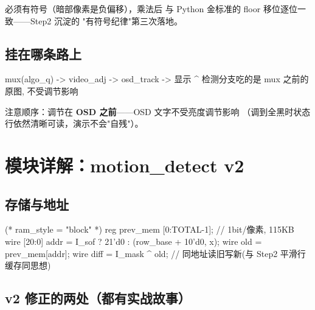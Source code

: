 
 必须有符号（暗部像素是负偏移），乘法后 
与 Python 金标准的 floor 移位逐位一致——Step2 沉淀的
"有符号纪律"第三次落地。

\subsection{挂在哪条路上}

\begin{Verilog}
mux(algo_q) -> video_adj -> osd_track -> 显示
                 ^
      检测分支吃的是 mux 之前的原图, 不受调节影响
\end{Verilog}

注意顺序：调节在 \textbf{OSD 之前}——OSD 文字不受亮度调节影响
（调到全黑时状态行依然清晰可读，演示不会"自残"）。

\section{模块详解：motion\_detect v2}

\subsection{存储与地址}

\begin{Verilog}
(* ram_style = "block" *) reg prev_mem [0:TOTAL-1];  // 1bit/像素, 115KB
wire [20:0] addr = I_sof ? 21'd0 : (row_base + {10'd0, x});
wire        old  = prev_mem[addr];
wire        diff = I_mask ^ old;
// 同地址读旧写新(与 Step2 平滑行缓存同思想)
\end{Verilog}

\subsection{v2 修正的两处（都有实战故事）}

